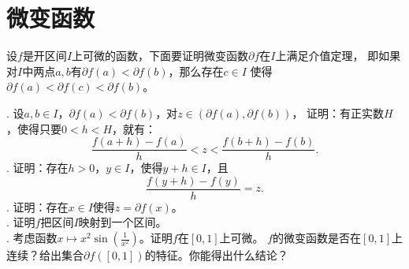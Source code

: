 \documentclass[12pt,UTF8]{ctexbook}
\begin{document}
\section{微变函数}


\begin{ex}\label{ex:3-2-4-0}
    设$f$是开区间$I$上可微的函数，下面要证明微变函数$\partial f$在$I$上满足介值定理，
    即如果对$I$中两点$a,b$有$\partial f(a) < \partial f(b)$，那么存在$c\in I$
    使得$\partial f(a) < \partial f(c) < \partial f(b)$。

    . 设$a,b\in I$，$\partial f(a) < \partial f(b)$，对$z \in (\partial f(a), \partial f(b))$，
    证明：有正实数$H$，使得只要$0 < h < H$，就有：
    $$ \frac{f(a + h) - f(a)}{h} < z < \frac{f(b + h) - f(b)}{h}. $$
    . 证明：存在$h>0$，$y\in I$，使得$y+h \in I$，且
    $$ \frac{f(y + h) - f(y)}{h} = z.$$
    . 证明：存在$x\in I$使得$z = \partial f(x)$。\\
    . 证明$f$把区间$I$映射到一个区间。\\
    . 考虑函数$x\mapsto x^2\sin{\left(\frac{1}{x^2}\right)}$。证明$f$在$[0,1]$上可微。
    $f$的微变函数是否在$[0,1]$上连续？给出集合$\partial f([0,1])$的特征。你能得出什么结论？
\end{ex}
\end{document}
